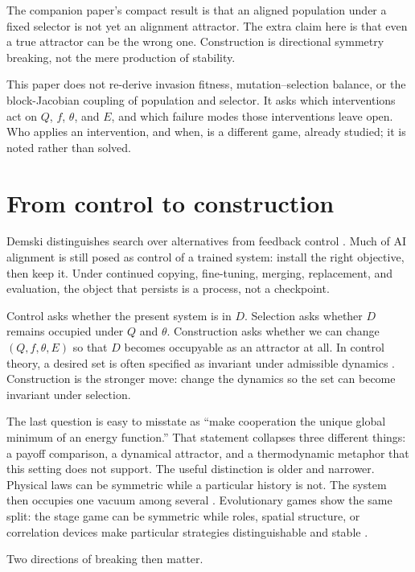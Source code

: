 \documentclass[11pt]{article}
\begin{document}
The companion paper's compact result is that an aligned population under a fixed selector is not yet an alignment attractor. The extra claim here is that even a true attractor can be the wrong one. Construction is directional symmetry breaking, not the mere production of stability.

This paper does not re-derive invasion fitness, mutation--selection balance, or the block-Jacobian coupling of population and selector. It asks which interventions act on \(Q\), \(f\), \(\theta\), and \(E\), and which failure modes those interventions leave open. Who applies an intervention, and when, is a different game, already studied; it is noted rather than solved.

\section{From control to construction}

Demski distinguishes search over alternatives from feedback control \parencite{demski2019}. Much of AI alignment is still posed as control of a trained system: install the right objective, then keep it. Under continued copying, fine-tuning, merging, replacement, and evaluation, the object that persists is a process, not a checkpoint.

Control asks whether the present system is in \(D\). 
Selection asks whether \(D\) remains occupied under \(Q\) and \(\theta\). 
Construction asks whether we can change \((Q,f,\theta,E)\) so that \(D\) becomes occupyable as an attractor at all. In control theory, a desired set is often specified as invariant under admissible dynamics \parencite{blanchini1999}. 
Construction is the stronger move: change the dynamics so the set can become invariant under selection.

The last question is easy to misstate as ``make cooperation the unique global minimum of an energy function.'' That statement collapses three different things: a payoff comparison, a dynamical attractor, and a thermodynamic metaphor that this setting does not support. The useful distinction is older and narrower. Physical laws can be symmetric while a particular history is not. The system then occupies one vacuum among several \parencite{anderson1972}. Evolutionary games show the same split: the stage game can be symmetric while roles, spatial structure, or correlation devices make particular strategies distinguishable and stable \parencite{nowak1992,nowak2006,skyrms2004}.

Two directions of breaking then matter.
\end{document}

